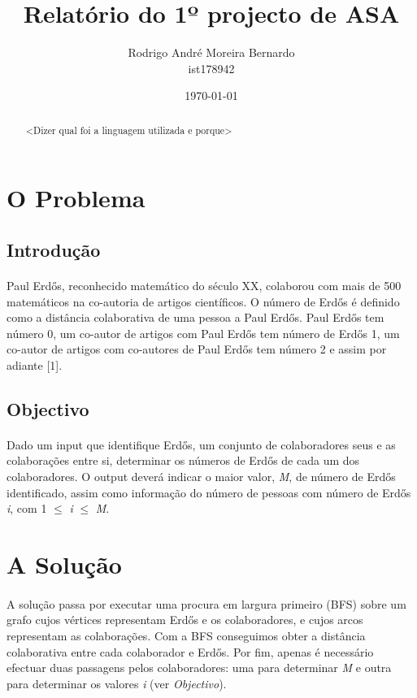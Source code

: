\documentclass[12pt, a4paper, margin=3cm]{article}
\title{\textbf{Relatório do 1º projecto de ASA}}
\author{Rodrigo André Moreira Bernardo \\ ist178942}
\affil{Instituto Superior Técnico}
\date{\today}
\begin{document}
\maketitle

\begin{abstract}
<Dizer qual foi a linguagem utilizada e porque>
\end{abstract}

\section{O Problema}

\subsection{Introdução}
\paragraph{}
Paul Erdős, reconhecido matemático do século XX, colaborou com mais de 500
matemáticos na co-autoria de artigos científicos.
O número de Erdős é definido como a distância colaborativa de uma pessoa a Paul
Erdős. Paul Erdős tem número 0, um co-autor de artigos com Paul Erdős tem número
de Erdős 1, um co-autor de artigos com co-autores de Paul Erdős tem número 2 e
assim por adiante [1].

\subsection{Objectivo}
\paragraph{}
Dado um input que identifique Erdős, um conjunto de colaboradores seus e as
colaborações entre si, determinar os números de Erdős de cada um dos
colaboradores. O output deverá indicar o maior valor, \textit{M}, de número de Erdős
identificado, assim como informação do número de pessoas com número de
Erdős \textit{i}, com 1 $\leq$ \textit{i} $\leq$ \textit{M}.

\section{A Solução}
\paragraph{}
A solução passa por executar uma procura em largura primeiro (BFS) sobre um
grafo cujos vértices representam Erdős e os colaboradores, e cujos arcos
representam as colaborações. Com a BFS conseguimos obter a distância
colaborativa entre cada colaborador e Erdős. Por fim, apenas é necessário
efectuar duas passagens pelos colaboradores: uma para determinar \textit{M} e
outra para determinar os valores \textit{i} (ver \textit{Objectivo}).
\end{document}
